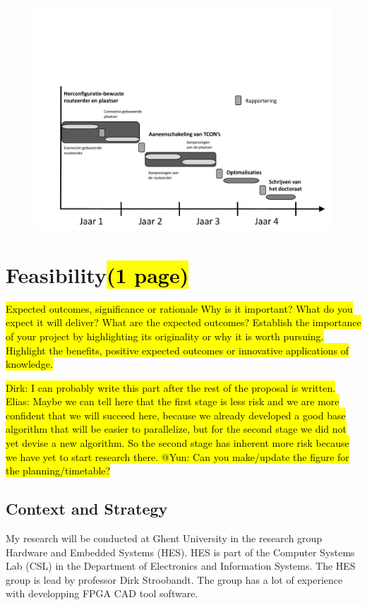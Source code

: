\documentclass[a4paper,oneside,12pt]{article}
\begin{document}
\begin{figure}[ht]
\centering
\includegraphics[width = \textwidth,trim = 0mm 0mm 0mm 70mm, clip]{tijdschema.pdf}
\end{figure}

\newpage
\section{Feasibility\hl{(1 page)}}
\hl{Expected outcomes, significance or rationale
Why is it important? 
What do you expect it will deliver? 
What are the expected outcomes? 
Establish the importance of your project by highlighting its originality or why it is worth pursuing. Highlight the benefits, positive expected outcomes or innovative applications of knowledge.}

\hl{Dirk: I can probably write this part after the rest of the proposal is written.\\
Elias: Maybe we can tell here that the first stage is less risk and we are more confident that we will succeed here, because we already developed a good base algorithm that will be easier to parallelize, but for the second stage we did not yet devise a new algorithm. So the second stage has inherent more risk because we have yet to start research there.
@Yun: Can you make/update the figure for the planning/timetable?}


\subsection{Context and Strategy}\label{context}
My research will be conducted at Ghent University in the research group Hardware and Embedded Systems (HES). HES is part of the Computer Systems Lab (CSL) in the Department of Electronics and Information Systems. The HES group is lead by professor Dirk Stroobandt. The group has a lot of experience with developping FPGA CAD tool software.
\end{document}
